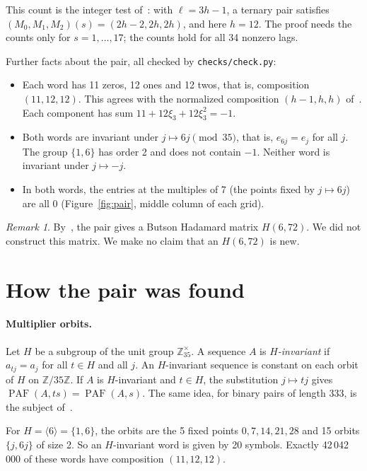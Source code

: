 \documentclass[11pt]{article}
\theoremstyle{remark}
\newtheorem{remark}[theorem]{Remark}
\newcommand{\PAF}{\operatorname{PAF}}
\newcommand{\Z}{\mathbb{Z}}
\begin{document}
This count is the integer test of~\cite[Appendix~A]{KLW}: with $\ell = 3h - 1$, a ternary pair satisfies $(M_0, M_1, M_2)(s) = (2h - 2, 2h, 2h)$, and here $h = 12$. The proof needs the counts only for $s = 1, \dots, 17$; the counts hold for all 34 nonzero lags.

Further facts about the pair, all checked by \texttt{checks/check.py}:
\begin{itemize}
  \item Each word has 11 zeros, 12 ones and 12 twos, that is, composition $(11, 12, 12)$. This agrees with the normalized composition $(h-1, h, h)$ of~\cite{KLW}. Each component has sum $11 + 12\xi_3 + 12\xi_3^2 = -1$.
  \item Both words are invariant under $j \mapsto 6j \pmod{35}$, that is, $e_{6j} = e_j$ for all $j$. The group $\{1, 6\}$ has order 2 and does not contain $-1$. Neither word is invariant under $j \mapsto -j$.
  \item In both words, the entries at the multiples of 7 (the points fixed by $j \mapsto 6j$) are all 0 (Figure~\ref{fig:pair}, middle column of each grid).
\end{itemize}

\begin{remark}
By~\cite[Corollary~6]{KLW}, the pair gives a Butson Hadamard matrix $H(6, 72)$. We did not construct this matrix. We make no claim that an $H(6, 72)$ is new.
\end{remark}

\section{How the pair was found}\label{sec:search}

\paragraph{Multiplier orbits.} Let $H$ be a subgroup of the unit group $\Z_{35}^\times$. A sequence $A$ is \emph{$H$-invariant} if $a_{tj} = a_j$ for all $t \in H$ and all $j$. An $H$-invariant sequence is constant on each orbit of $H$ on $\Z/35\Z$. If $A$ is $H$-invariant and $t \in H$, the substitution $j \mapsto tj$ gives $\PAF(A, ts) = \PAF(A, s)$. The same idea, for binary pairs of length 333, is the subject of~\cite{RHQ}.

For $H = \langle 6 \rangle = \{1, 6\}$, the orbits are the 5 fixed points $0, 7, 14, 21, 28$ and 15 orbits $\{j, 6j\}$ of size 2. So an $H$-invariant word is given by 20 symbols. Exactly 42\,042\,000 of these words have composition $(11, 12, 12)$.
\end{document}
